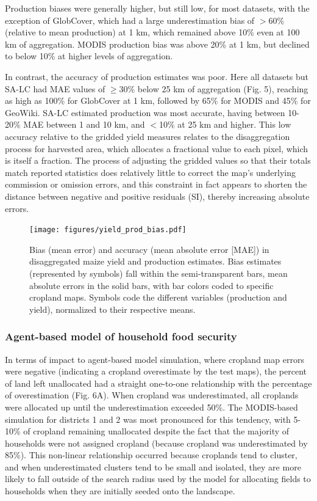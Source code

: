 \documentclass[a4paper]{article}
\begin{document}
Production biases were generally higher, but still low, for most datasets, with the exception of GlobCover, which had a large underestimation bias of $>$60\% (relative to mean production) at 1 km, which remained above 10\% even at 100 km of aggregation. MODIS production bias was above 20\% at 1 km, but declined to below 10\% at higher levels of aggregation.  

In contrast, the accuracy of production estimates was poor. Here all datasets but SA-LC had MAE values of $\geq$30\% below 25 km of aggregation (Fig. 5), reaching as high as 100\% for GlobCover at 1 km, followed by 65\% for MODIS and 45\% for GeoWiki. SA-LC estimated production was most accurate, having between 10-20\% MAE between 1 and 10 km, and $<$10\% at 25 km and higher.  This low accuracy relative to the gridded yield measures relates to the disaggregation process for harvested area, which allocates a fractional value to each pixel, which is itself a fraction. The process of adjusting the gridded values so that their totals match reported statistics does relatively little to correct the map's underlying commission or omission errors, and this constraint in fact appears to shorten the distance between negative and positive residuals (SI), thereby increasing absolute errors.  

\begin{figure}[!ht]
\centerline{\texttt{[image: figures/yield\_prod\_bias.pdf]}}
\caption{Bias (mean error) and accuracy (mean absolute error [MAE]) in disaggregated maize yield and production estimates. Bias estimates (represented by symbols) fall within the semi-transparent bars, mean absolute errors in the solid bars, with bar colors coded to specific cropland maps.  Symbols code the different variables (production and yield), normalized to their respective means.}
\label{afoto}
\end{figure}

\vspace{-0.3 cm}
\subsubsection*{Agent-based model of household food security}
\vspace{-0.2 cm}
In terms of impact to agent-based model simulation, where cropland map errors were negative (indicating a cropland overestimate by the test maps), the percent of land left unallocated had a straight one-to-one relationship with the percentage of overestimation (Fig. 6A). When cropland was underestimated, all croplands were allocated up until the underestimation exceeded 50\%. The MODIS-based simulation for districts 1 and 2 was most pronounced for this tendency, with 5-10\% of cropland remaining unallocated despite the fact that the majority of households were not assigned cropland (because cropland was underestimated by 85\%). This non-linear relationship occurred because croplands tend to cluster, and when underestimated clusters tend to be small and isolated, they are more likely to fall outside of the search radius used by the model for allocating fields to households when they are initially seeded onto the landscape. 
\end{document}
